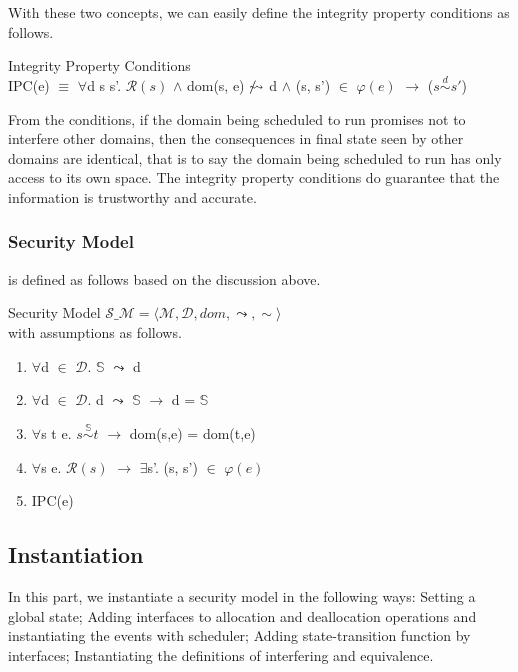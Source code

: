\documentclass[runningheads]{llncs}
\makeatletter
\newcommand{\equidom}[3]{{#1}\stackrel{#2}{\sim}{#3}}
\newcommand{\superimpose}[2]
	{{\ooalign{$#1\@firstoftwo#2$\cr\hfil$#1\@secondoftwo#2$\hfil\cr}}}
\newcommand{\interf}{\leadsto}
\newcommand{\ninterf}{\mathrel{\mathpalette\superimpose{{\slash}{\leadsto}}}}
\makeatother
\begin{document}
With these two concepts, we can easily define the integrity property conditions as follows.

\begin{definition} {Integrity Property Conditions} \\
IPC(e) $\equiv$ $\forall$d s s'. $\mathcal{R}(s)$ $\wedge$ dom(s, e) $\ninterf$ d $\wedge$ (s, s') $\in$ $\varphi(e)$ $\longrightarrow$ ($\equidom{s}{d}{s'}$)
\end{definition}

From the conditions, if the domain being scheduled to run promises not to interfere other domains, then the consequences in final state seen by other domains are identical, that is to say the domain being scheduled to run has only access to its own space. The integrity property conditions do guarantee that the information is trustworthy and accurate.

\subsubsection{Security Model} is defined as follows based on the discussion above.

\begin{definition} {Security Model} $\mathcal{S\_M} = \langle \mathcal{M}, \mathcal{D}, dom, \interf, \sim \rangle$ \\
with assumptions as follows.
\begin{enumerate}
\item $\forall$d $\in$ $\mathcal{D}$. $\mathbb{S}$ $\interf$ d
\item $\forall$d $\in$ $\mathcal{D}$. d $\interf$ $\mathbb{S}$ $\longrightarrow$ d = $\mathbb{S}$
\item $\forall$s t e. $\equidom{s}{\mathbb{S}}{t}$ $\longrightarrow$ dom(s,e) = dom(t,e)
\item $\forall$s e. $\mathcal{R}(s)$ $\longrightarrow$ $\exists$s'. (s, s') $\in$ $\varphi(e)$
\item IPC(e)
\end{enumerate}
\end{definition}

\subsection{Instantiation}
In this part, we instantiate a security model in the following ways: Setting a global state; Adding interfaces to allocation and deallocation operations and instantiating the events with scheduler; Adding state-transition function by interfaces; Instantiating the definitions of interfering and equivalence.
\end{document}

